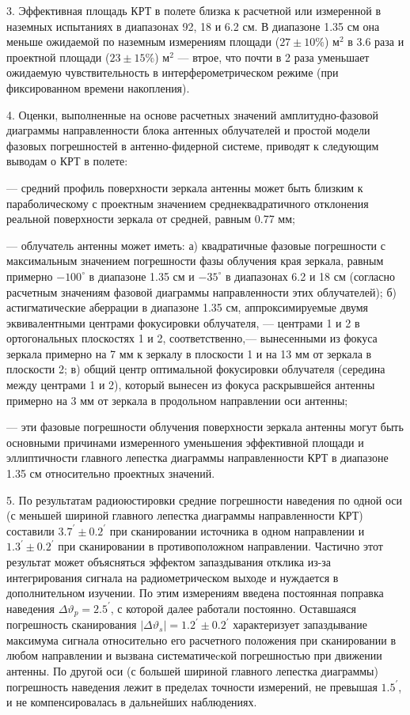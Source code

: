 3. Эффективная площадь КРТ в полете близка к расчетной или измеренной в наземных
испытаниях в диапазонах 92, 18 и 6.2 см.
В диапазоне 1.35 см она меньше ожидаемой по наземным измерениям площади
($27 \pm 10\%$) м$^2$ в 3.6 раза и проектной площади ($23 \pm 15\%$) м$^2$ ---
втрое, что почти в 2 раза уменьшает ожидаемую чувствительность в
интерферометрическом режиме (при фиксированном времени накопления).

4. Оценки, выполненные на основе расчетных значений амплитудно-фазовой диаграммы
направленности блока антенных облучателей  и простой модели фазовых погрешностей
в антенно-фидерной системе, приводят к следующим выводам о КРТ в полете:

--- средний профиль поверхности зеркала антенны может быть близким к
 параболическому с проектным значением  среднеквадратичного отклонения
 реальной поверхности зеркала от средней, равным 0.77 мм;

---  облучатель антенны может иметь:
а) квадратичные фазовые погрешности с максимальным значением
погрешности фазы облучения края зеркала, равным примерно $-100^\circ$ в
диапазоне 1.35 см и $-35^\circ$ в диапазонах 6.2 и 18 см
(согласно расчетным значениям фазовой диаграммы направленности
этих облучателей);
б) астигматические аберрации в диапазоне 1.35 см, аппроксимируемые
двумя эквивалентными центрами фокусировки облучателя, --- центрами 1 и 2
в ортогональных плоскостях 1 и 2, соответственно,---
вынесенными из фокуса зеркала примерно на 7 мм к зеркалу в
плоскости 1 и на 13 мм от зеркала в плоскости 2;
в) общий центр оптимальной фокусировки облучателя
(середина между центрами 1 и 2), который вынесен из фокуса
раскрывшейся антенны примерно на 3 мм от
зеркала в продольном направлении оси антенны;

--- эти фазовые погрешности облучения поверхности зеркала антенны
могут быть основными причинами измеренного уменьшения эффективной
площади и эллиптичности главного лепестка диаграммы направленности
КРТ в диапазоне 1.35 см  относительно проектных значений.

5. По результатам радиоюстировки средние погрешности наведения по
одной оси (с меньшей шириной главного лепестка диаграммы направленности
КРТ) составили $3.7^\prime \pm 0.2^\prime$  при
сканировании источника в одном направлении и $1.3^\prime \pm 0.2^\prime$  при сканировании в
противоположном направлении.
Частично этот результат может объясняться эффектом запаздывания отклика
из-за интегрирования
сигнала на радиометрическом выходе и нуждается в дополнительном изучении.
По этим измерениям введена постоянная поправка наведения
$\Delta \vartheta_p = 2.5^\prime$,
с которой далее работали постоянно. Оставшаяся погрешность сканирования
$\vert \Delta \vartheta_s \vert = 1.2^\prime \pm 0.2^\prime$   характеризует
запаздывание максимума сигнала относительно его расчетного
положения при сканировании в любом направлении и вызвана систематичеcкой
погрешностью при движении антенны.
По другой оси (с большей шириной главного лепестка диаграммы) погрешность
наведения лежит в пределах точности измерений, не превышая $1.5^\prime$,
и не компенсировалась в дальнейших наблюдениях.


